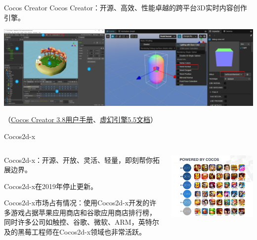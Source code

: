 \documentclass{beamer}
\newcommand{\hrefcol}[2]{\textcolor{cyan}{\href{#1}{#2}}}
\begin{document}

\begin{frame}[fragile]{Cocos Creator}
Cocos Creator：开源、高效、性能卓越的跨平台3D实时内容创作引擎。

\vspace{1em}

\includegraphics[width=\textwidth]
{figures/cocos_creator}

\vspace{1em}

（\hrefcol{https://docs.cocos.com/creator/3.8/manual/zh}{Cocos Creator 3.8用户手册}、\hrefcol{https://dev.epicgames.com/documentation/zh-cn/unreal-engine/unreal-engine-5-5-documentation}{虚幻引擎5.5文档}）
\end{frame}


\begin{frame}[fragile]{Cocos2d-x}
\begin{columns}
\begin{column}{0.5\textwidth}
Cocos2d-x：开源、开放、灵活、轻量，即刻帮你拓展边界。

\vspace{1em}

Cocos2d-x在2019年停止更新。

\vspace{1em}

Cocos2d-x市场占有情况：使用Cocos2d-x开发的许多游戏占据苹果应用商店和谷歌应用商店排行榜，同时许多公司如触控、谷歌、微软、ARM，英特尔及的黑莓工程师在Cocos2d-x领域也非常活跃。
\end{column}
\begin{column}{0.5\textwidth}
\includegraphics[width=\textwidth]
{figures/cocos2dx_games}
\end{column}
\end{columns}
\end{frame}
\end{document}
